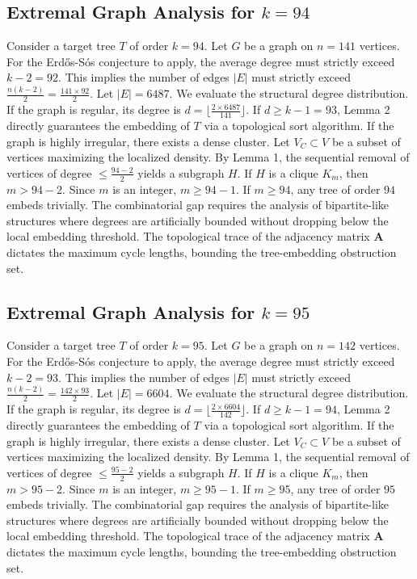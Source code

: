 \documentclass[11pt,a4paper]{article}
\begin{document}
\subsection{Extremal Graph Analysis for $k=94$}
Consider a target tree $T$ of order $k=94$.
Let $G$ be a graph on $n=141$ vertices.
For the Erd\H{o}s-S\'os conjecture to apply, the average degree must strictly exceed $k-2 = 92$.
This implies the number of edges $|E|$ must strictly exceed $\frac{n(k-2)}{2} = \frac{141 \times 92}{2}$.
Let $|E| = 6487$.
We evaluate the structural degree distribution. If the graph is regular, its degree is $d = \lfloor \frac{2 \times 6487}{141} \rfloor$.
If $d \geq k-1 = 93$, Lemma 2 directly guarantees the embedding of $T$ via a topological sort algorithm.
If the graph is highly irregular, there exists a dense cluster. Let $V_C \subset V$ be a subset of vertices maximizing the localized density.
By Lemma 1, the sequential removal of vertices of degree $\leq \frac{94-2}{2}$ yields a subgraph $H$.
If $H$ is a clique $K_{m}$, then $m > 94-2$. Since $m$ is an integer, $m \geq 94-1$. If $m \geq 94$, any tree of order $94$ embeds trivially.
The combinatorial gap requires the analysis of bipartite-like structures where degrees are artificially bounded without dropping below the local embedding threshold. The topological trace of the adjacency matrix $\mathbf{A}$ dictates the maximum cycle lengths, bounding the tree-embedding obstruction set.


\subsection{Extremal Graph Analysis for $k=95$}
Consider a target tree $T$ of order $k=95$.
Let $G$ be a graph on $n=142$ vertices.
For the Erd\H{o}s-S\'os conjecture to apply, the average degree must strictly exceed $k-2 = 93$.
This implies the number of edges $|E|$ must strictly exceed $\frac{n(k-2)}{2} = \frac{142 \times 93}{2}$.
Let $|E| = 6604$.
We evaluate the structural degree distribution. If the graph is regular, its degree is $d = \lfloor \frac{2 \times 6604}{142} \rfloor$.
If $d \geq k-1 = 94$, Lemma 2 directly guarantees the embedding of $T$ via a topological sort algorithm.
If the graph is highly irregular, there exists a dense cluster. Let $V_C \subset V$ be a subset of vertices maximizing the localized density.
By Lemma 1, the sequential removal of vertices of degree $\leq \frac{95-2}{2}$ yields a subgraph $H$.
If $H$ is a clique $K_{m}$, then $m > 95-2$. Since $m$ is an integer, $m \geq 95-1$. If $m \geq 95$, any tree of order $95$ embeds trivially.
The combinatorial gap requires the analysis of bipartite-like structures where degrees are artificially bounded without dropping below the local embedding threshold. The topological trace of the adjacency matrix $\mathbf{A}$ dictates the maximum cycle lengths, bounding the tree-embedding obstruction set.
\end{document}
